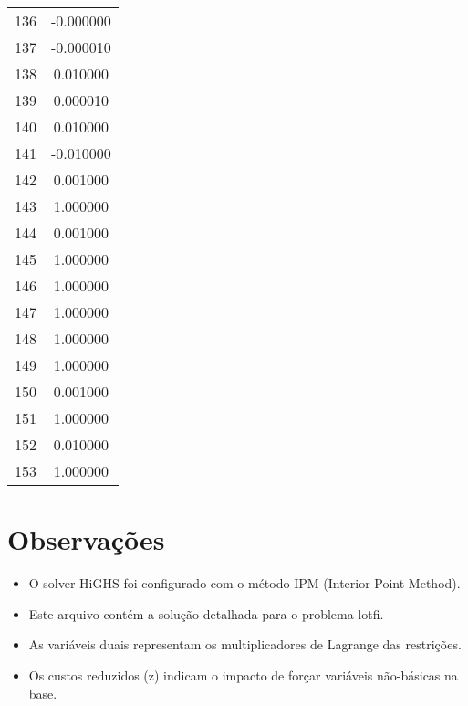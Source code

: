 \documentclass[12pt]{article}
\begin{document}
\begin{longtable}{@{}cc@{}}
136 & -0.000000 \\
137 & -0.000010 \\
138 & 0.010000 \\
139 & 0.000010 \\
140 & 0.010000 \\
141 & -0.010000 \\
142 & 0.001000 \\
143 & 1.000000 \\
144 & 0.001000 \\
145 & 1.000000 \\
146 & 1.000000 \\
147 & 1.000000 \\
148 & 1.000000 \\
149 & 1.000000 \\
150 & 0.001000 \\
151 & 1.000000 \\
152 & 0.010000 \\
153 & 1.000000 \\

\end{longtable}


\section{Observações}

\begin{itemize}
\item O solver HiGHS foi configurado com o método IPM (Interior Point Method).
\item Este arquivo contém a solução detalhada para o problema lotfi.
\item As variáveis duais representam os multiplicadores de Lagrange das restrições.
\item Os custos reduzidos (z) indicam o impacto de forçar variáveis não-básicas na base.
\end{itemize}
\end{document}
